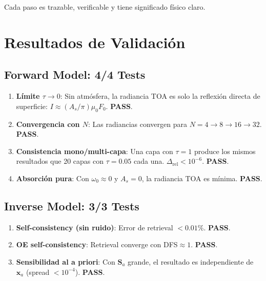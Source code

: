 \documentclass[a4paper,11pt]{article}
\begin{document}
Cada paso es trazable, verificable y tiene significado f\'isico claro.


\section{Resultados de Validaci\'on}

\subsection{Forward Model: 4/4 Tests}

\begin{enumerate}
    \item \textbf{L\'imite $\tau \to 0$}: Sin atm\'osfera, la radiancia TOA
          es solo la reflexi\'on directa de superficie:
          $I \approx (A_s/\pi)\mu_0 F_0$. \textbf{PASS}.

    \item \textbf{Convergencia con $N$}: Las radiancias convergen para
          $N = 4 \to 8 \to 16 \to 32$. \textbf{PASS}.

    \item \textbf{Consistencia mono/multi-capa}: Una capa con $\tau=1$ produce
          los mismos resultados que 20 capas con $\tau=0.05$ cada una.
          $\Delta_{\text{rel}} < 10^{-6}$. \textbf{PASS}.

    \item \textbf{Absorci\'on pura}: Con $\omega_0 \approx 0$ y $A_s = 0$,
          la radiancia TOA es m\'inima. \textbf{PASS}.
\end{enumerate}

\subsection{Inverse Model: 3/3 Tests}

\begin{enumerate}
    \item \textbf{Self-consistency (sin ruido)}: Error de retrieval
          $< 0.01\%$. \textbf{PASS}.

    \item \textbf{OE self-consistency}: Retrieval converge con DFS$\approx 1$.
          \textbf{PASS}.

    \item \textbf{Sensibilidad al a priori}: Con $\mathbf{S}_a$ grande,
          el resultado es independiente de $\mathbf{x}_a$ (spread $< 10^{-4}$).
          \textbf{PASS}.
\end{enumerate}
\end{document}

